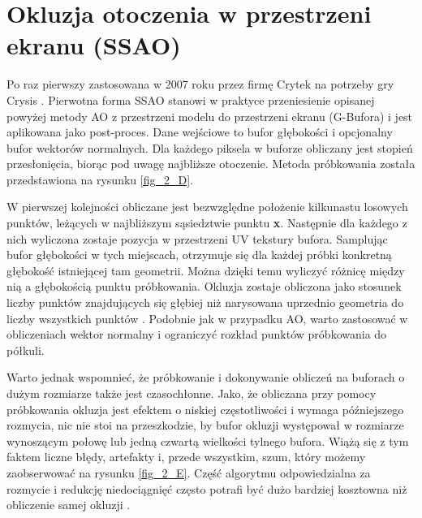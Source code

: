 	\section{Okluzja otoczenia w przestrzeni ekranu (SSAO)}
	\label{t:teoria:ssao}
	
	Po raz pierwszy zastosowana w 2007 roku przez firmę Crytek na potrzeby gry Crysis \cite{crytek}. Pierwotna forma SSAO stanowi w praktyce przeniesienie opisanej powyżej metody AO z przestrzeni modelu do przestrzeni ekranu (G-Bufora) i jest aplikowana jako post-proces. Dane wejściowe to bufor głębokości i opcjonalny bufor wektorów normalnych. Dla każdego piksela w buforze obliczany jest stopień przesłonięcia, biorąc pod uwagę najbliższe otoczenie. Metoda próbkowania została przedstawiona na rysunku \ref{fig_2_D}.
	
	
	W pierwszej kolejności obliczane jest bezwzględne położenie kilkunastu losowych punktów, leżących w najbliższym sąsiedztwie punktu \textbf{x}. Następnie dla każdego z nich wyliczona zostaje pozycja w przestrzeni UV tekstury bufora. Samplując bufor głębokości w tych miejscach, otrzymuje się dla każdej próbki konkretną głębokość istniejącej tam geometrii. Można dzięki temu wyliczyć różnicę między nią a głębokością punktu próbkowania. Okluzja zostaje obliczona jako stosunek liczby punktów znajdujących się głębiej niż narysowana uprzednio geometria do liczby wszystkich punktów \cite{luna}. Podobnie jak w przypadku AO, warto zastosować w obliczeniach wektor normalny i ograniczyć rozkład punktów próbkowania do półkuli.
	
	
	
	Warto jednak wspomnieć, że próbkowanie i dokonywanie obliczeń na buforach o dużym rozmiarze także jest czasochłonne. Jako, że obliczana przy pomocy próbkowania okluzja jest efektem o niskiej częstotliwości i wymaga późniejszego rozmycia, nic nie stoi na przeszkodzie, by bufor okluzji występował w rozmiarze wynoszącym połowę lub jedną czwartą wielkości tylnego bufora. Wiążą się z tym faktem liczne błędy, artefakty i, przede wszystkim, szum, który możemy zaobserwować na rysunku \ref{fig_2_E}. Część algorytmu odpowiedzialna za rozmycie i redukcję niedociągnięć często potrafi być dużo bardziej kosztowna niż obliczenie samej okluzji \cite{statvo}.
	

